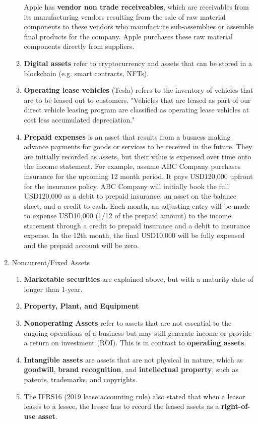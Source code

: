 \documentclass{article}
\begin{document}
\begin{enumerate}
\begin{enumerate}
      Apple has \textbf{vendor non trade receiveables}, which are receivables from its manufacturing vendors resulting from the sale of raw material components to these vendors who manufacture sub-assemblies or assemble final products for the company. Apple purchases these raw material components directly from suppliers.
      \item \textbf{Digital assets} refer to cryptocurrency and assets that can be stored in a blockchain (e.g. smart contracts, NFTs).
      \item \textbf{Operating lease vehicles} (Tesla) refers to the inventory of vehicles that are to be leased out to customers. "Vehicles that are leased as part of our direct vehicle leasing program are classified as operating lease vehicles at cost less accumulated depreciation."
      \item \textbf{Prepaid expenses} is an asset that results from a busness making advance payments for goods or services to be received in the future. They are initially recorded as assets, but their value is expensed over time onto the income statement. For example, assume ABC Company purchases insurance for the upcoming 12 month period. It pays USD120,000 upfront for the insurance policy. ABC Company will initially book the full USD120,000 as a debit to prepaid insurance, an asset on the balance sheet, and a credit to cash. Each month, an adjusting entry will be made to expense USD10,000 (1/12 of the prepaid amount) to the income statement through a credit to prepaid insurance and a debit to insurance expense. In the 12th month, the final USD10,000 will be fully expensed and the prepaid account will be zero.
    \end{enumerate}

    \item Noncurrent/Fixed Assets
    \begin{enumerate}
      \item \textbf{Marketable securities} are explained above, but with a maturity date of longer than 1-year.
      \item \textbf{Property, Plant, and Equipment}
      \item \textbf{Nonoperating Assets} refer to assets that are not essential to the ongoing operations of a business but may still generate income or provide a return on investment (ROI). This is in contrast to \textbf{operating assets}.
      \item \textbf{Intangible assets} are assets that are not physical in nature, which as \textbf{goodwill}, \textbf{brand recognition}, and \textbf{intellectual property}, such as patents, trademarks, and copyrights.
      \item The IFRS16 (2019 lease accounting rule) also stated that when a leasor leases to a lessee, the lessee has to record the leased assets as a \textbf{right-of-use asset}.
    \end{enumerate}


\end{enumerate}
\end{document}
